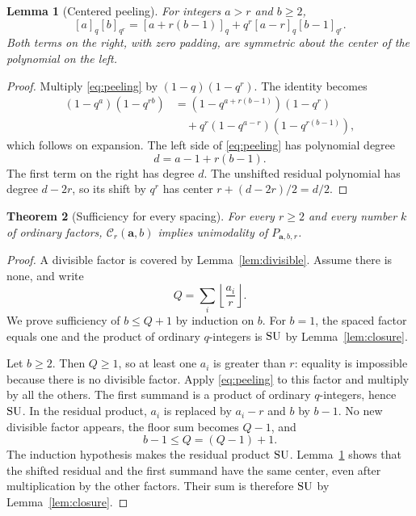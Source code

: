 \documentclass[11pt]{article}
\theoremstyle{research}
\newtheorem{theorem}{Theorem}[section]
\newtheorem{lemma}[theorem]{Lemma}
\theoremstyle{definition}
\newcommand{\qi}[1]{[#1]_q}
\newcommand{\qir}[2]{[#1]_{q^{#2}}}
\newcommand{\SU}{\textup{SU}}
\numberwithin{equation}{section}
\begin{document}
\begin{lemma}[Centered peeling]\label{lem:peeling}
For integers $a>r$ and $b\ge2$,
\begin{equation}\label{eq:peeling}
 \qi a\qir b r
 =\qi{a+r(b-1)}+q^r\qi{a-r}\qir{b-1}{r}.
\end{equation}
Both terms on the right, with zero padding, are symmetric about the
center of the polynomial on the left.
\end{lemma}
\begin{proof}
Multiply \eqref{eq:peeling} by $(1-q)(1-q^r)$. The identity becomes
\begin{align*}
 (1-q^a)(1-q^{rb})
 &= (1-q^{a+r(b-1)})(1-q^r)\\
 &\quad +q^r(1-q^{a-r})(1-q^{r(b-1)}),
\end{align*}
which follows on expansion. The left side of \eqref{eq:peeling} has
polynomial degree
\[
 d=a-1+r(b-1).
\]
The first term on the right has degree $d$. The unshifted residual
polynomial has degree $d-2r$, so its shift by $q^r$ has center
$r+(d-2r)/2=d/2$.
\end{proof}

\begin{theorem}[Sufficiency for every spacing]\label{thm:sufficient}
For every $r\ge2$ and every number $k$ of ordinary factors,
$\mathcal C_r(\boldsymbol a,b)$ implies unimodality of
$P_{\boldsymbol a,b,r}$.
\end{theorem}
\begin{proof}
A divisible factor is covered by Lemma~\ref{lem:divisible}. Assume there
is none, and write
\[
 Q=\sum_i\left\lfloor\frac{a_i}{r}\right\rfloor.
\]
We prove sufficiency of $b\le Q+1$ by induction on $b$.
For $b=1$, the spaced factor equals one and the product of ordinary
$q$-integers is $\SU$ by Lemma~\ref{lem:closure}.

Let $b\ge2$. Then $Q\ge1$, so at least one $a_i$ is greater than $r$:
equality is impossible because there is no divisible factor.
Apply \eqref{eq:peeling} to this factor and multiply by all the others.
The first summand is a product of ordinary $q$-integers, hence $\SU$.
In the residual product, $a_i$ is replaced by $a_i-r$ and $b$ by $b-1$.
No new divisible factor appears, the floor sum becomes $Q-1$, and
\[
 b-1\le Q=(Q-1)+1.
\]
The induction hypothesis makes the residual product $\SU$.
Lemma~\ref{lem:peeling} shows that the shifted residual and the first
summand have the same center, even after multiplication by the other
factors. Their sum is therefore $\SU$ by Lemma~\ref{lem:closure}.
\end{proof}
\end{document}
